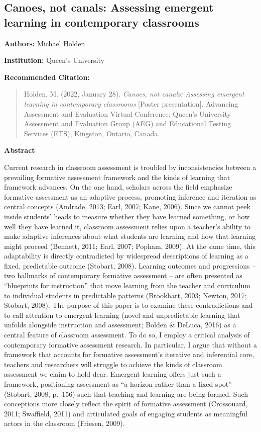 \documentclass[
]{book}
\begin{document}
\newpage

\hypertarget{canoes-not-canals-assessing-emergent-learning-in-contemporary-classrooms}{%
\subsection{Canoes, not canals: Assessing emergent learning in contemporary classrooms}\label{canoes-not-canals-assessing-emergent-learning-in-contemporary-classrooms}}

\textbf{Authors:} Michael Holden

\textbf{Institution:} Queen's University

\textbf{Recommended Citation:}

\begin{quote}
Holden, M. (2022, January 28). \emph{Canoes, not canals: Assessing emergent learning in contemporary classrooms} {[}Poster presentation{]}. Advancing Assessment and Evaluation Virtual Conference: Queen's University Assessment and Evaluation Group (AEG) and Educational Testing Services (ETS), Kingston, Ontario, Canada.
\end{quote}

\textbf{Abstract}

Current research in classroom assessment is troubled by inconsistencies between a prevailing formative assessment framework and the kinds of learning that framework advances. On the one hand, scholars across the field emphasize formative assessment as an adaptive process, promoting inference and iteration as central concepts (Andrade, 2013; Earl, 2007; Kane, 2006). Since we cannot peek inside students' heads to measure whether they have learned something, or how well they have learned it, classroom assessment relies upon a teacher's ability to make adaptive inferences about what students are learning and how that learning might proceed (Bennett, 2011; Earl, 2007; Popham, 2009). At the same time, this adaptability is directly contradicted by widespread descriptions of learning as a fixed, predictable outcome (Stobart, 2008). Learning outcomes and progressions -- two hallmarks of contemporary formative assessment -- are often presented as ``blueprints for instruction'' that move learning from the teacher and curriculum to individual students in predictable patterns (Brookhart, 2003; Newton, 2017; Stobart, 2008). The purpose of this paper is to examine these contradictions and to call attention to emergent learning (novel and unpredictable learning that unfolds alongside instruction and assessment; Bolden \& DeLuca, 2016) as a central feature of classroom assessment. To do so, I employ a critical analysis of contemporary formative assessment research. In particular, I argue that without a framework that accounts for formative assessment's iterative and inferential core, teachers and researchers will struggle to achieve the kinds of classroom assessment we claim to hold dear. Emergent learning offers just such a framework, positioning assessment as ``a horizon rather than a fixed spot'' (Stobart, 2008, p.~156) such that teaching and learning are being formed. Such conceptions more closely reflect the spirit of formative assessment (Crossouard, 2011; Swaffield, 2011) and articulated goals of engaging students as meaningful actors in the classroom (Friesen, 2009).
\end{document}
